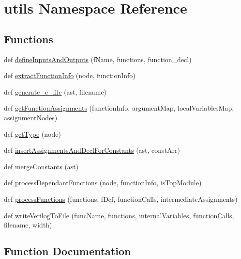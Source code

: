\hypertarget{namespaceutils}{}\section{utils Namespace Reference}
\label{namespaceutils}
\subsection*{Functions}
\begin{DoxyCompactItemize}
\item 
def \hyperlink{namespaceutils_ad890ef664f4412df3dbe4f96f71261bd}{define\+Inputs\+And\+Outputs} (f\+Name, functions, function\+\_\+decl)
\item 
def \hyperlink{namespaceutils_a01c8b36149daaab35946bf42cf90fcc1}{extract\+Function\+Info} (node, function\+Info)
\item 
def \hyperlink{namespaceutils_a5ab527c9affdfd39949f2e88c4299989}{generate\+\_\+c\+\_\+file} (ast, filename)
\item 
def \hyperlink{namespaceutils_a04fa4bbfa41595f584571fb61a6047c5}{get\+Function\+Assignments} (function\+Info, argument\+Map, local\+Variables\+Map, assignment\+Nodes)
\item 
def \hyperlink{namespaceutils_a63a441384eb62bbf51329ab7e1b212a6}{get\+Type} (node)
\item 
def \hyperlink{namespaceutils_a694fa47d55cc41b3f9e86ab2f90e98f3}{insert\+Assignments\+And\+Decl\+For\+Constants} (ast, const\+Arr)
\item 
def \hyperlink{namespaceutils_aaebca5d3cb4f9c54ab10670ed1ce52a9}{merge\+Constants} (ast)
\item 
def \hyperlink{namespaceutils_a6c1d5e886507ec0741fb0fce3f642c5b}{process\+Dependant\+Functions} (node, function\+Info, is\+Top\+Module)
\item 
def \hyperlink{namespaceutils_a4934e690de4b9b81cb16a1df0dbd73b9}{process\+Functions} (functions, f\+Def, function\+Calls, intermediate\+Assignments)
\item 
def \hyperlink{namespaceutils_a6f07e72ab5f460900eea8da9ad34aeec}{write\+Verilog\+To\+File} (func\+Name, functions, internal\+Variables, function\+Calls, filename, width)
\end{DoxyCompactItemize}


\subsection{Function Documentation}
\mbox{\label{namespaceutils_ad890ef664f4412df3dbe4f96f71261bd}} 
